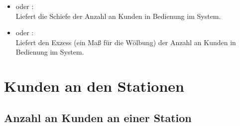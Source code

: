 \begin{itemize}
\item
{} oder :\\
Liefert die Schiefe der Anzahl an Kunden in Bedienung im System.

\item
{} oder :\\
Liefert den Exzess (ein Maß für die Wölbung) der Anzahl an Kunden in Bedienung im System.

\end{itemize}





\section{Kunden an den Stationen}



\subsection{Anzahl an Kunden an einer Station}

